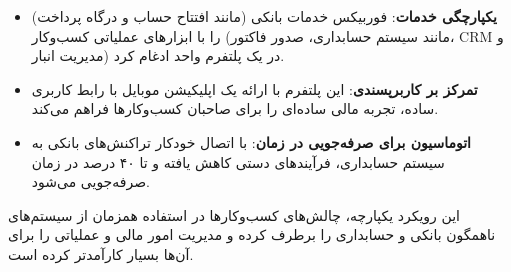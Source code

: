 \begin{itemize}
    \item \textbf{یکپارچگی خدمات}: فوربیکس خدمات بانکی (مانند افتتاح حساب و درگاه پرداخت) را با ابزارهای عملیاتی کسب‌وکار (مانند سیستم حسابداری، صدور فاکتور، CRM و مدیریت انبار) در یک پلتفرم واحد ادغام کرد.
    \item \textbf{تمرکز بر کاربرپسندی}: این پلتفرم با ارائه یک اپلیکیشن موبایل با رابط کاربری ساده، تجربه مالی ساده‌ای را برای صاحبان کسب‌وکارها فراهم می‌کند.
    \item \textbf{اتوماسیون برای صرفه‌جویی در زمان}: با اتصال خودکار تراکنش‌های بانکی به سیستم حسابداری، فرآیندهای دستی کاهش یافته و تا ۴۰ درصد در زمان صرفه‌جویی می‌شود.
\end{itemize}

این رویکرد یکپارچه، چالش‌های کسب‌وکارها در استفاده همزمان از سیستم‌های ناهمگون بانکی و حسابداری را برطرف کرده و مدیریت امور مالی و عملیاتی را برای آن‌ها بسیار کارآمدتر کرده است.
